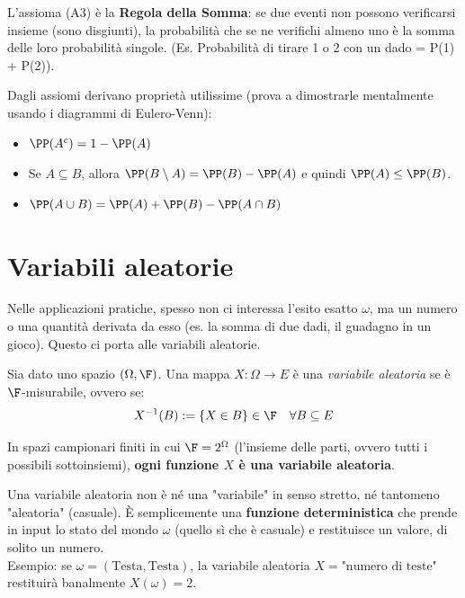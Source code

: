 \begin{hint}[Additività]
    L'assioma (A3) è la \textbf{Regola della Somma}: se due eventi non possono verificarsi insieme (sono disgiunti), la probabilità che se ne verifichi almeno uno è la somma delle loro probabilità singole. (Es. Probabilità di tirare 1 o 2 con un dado = P(1) + P(2)).
\end{hint}

Dagli assiomi derivano proprietà utilissime (prova a dimostrarle mentalmente usando i diagrammi di Eulero-Venn):
\begin{itemize}
    \item $\PP(A^c) = 1 - \PP(A)$
    \item Se $A \subseteq B$, allora $\PP(B \setminus A) = \PP(B) - \PP(A)$ e quindi $\PP(A) \le \PP(B)$.
    \item $\PP(A \cup B) = \PP(A) + \PP(B) - \PP(A \cap B)$
\end{itemize}

\section{Variabili aleatorie}

Nelle applicazioni pratiche, spesso non ci interessa l'esito esatto $\omega$, ma un numero o una quantità derivata da esso (es. la somma di due dadi, il guadagno in un gioco). Questo ci porta alle variabili aleatorie.

\begin{definition}
Sia dato uno spazio $(\Omega, \F)$. Una mappa $X : \Omega \to E$ è una \emph{variabile aleatoria} se è $\F$-misurabile, ovvero se:
\[ X^{-1}(B) := \{X \in B\} \in \F \quad \forall B \subseteq E \]
\end{definition}

In spazi campionari finiti in cui $\F = 2^\Omega$ (l'insieme delle parti, ovvero tutti i possibili sottoinsiemi), \textbf{ogni funzione $X$ è una variabile aleatoria}.

\begin{spiegazione}
    Una variabile aleatoria non è né una "variabile" in senso stretto, né tantomeno "aleatoria" (casuale). È semplicemente una \textbf{funzione deterministica} che prende in input lo stato del mondo $\omega$ (quello sì che è casuale) e restituisce un valore, di solito un numero. \\
    Esempio: se $\omega = (\text{Testa}, \text{Testa})$, la variabile aleatoria $X = \text{"numero di teste"}$ restituirà banalmente $X(\omega) = 2$.
\end{spiegazione}

